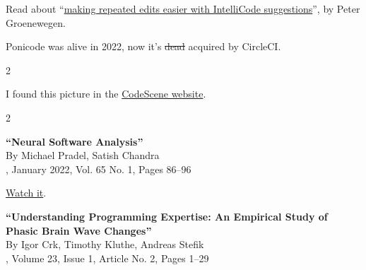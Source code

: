 \documentclass{article}
\begin{document}
\plush{}


Read about ``\href{https://devblogs.microsoft.com/visualstudio/making-repeated-edits-easier-with-intellicode-suggestions/}{making repeated edits easier with IntelliCode suggestions}'', by Peter Groenewegen.

\plush{}


Ponicode was alive in 2022, now it's \st{dead} acquired by CircleCI.

\plush{}


\begin{multicols}{2}
\par\columnbreak\par
I found this picture in the \href{https://codescene.com/engineering-blog/refactoring-recommendations}{CodeScene website}.
\end{multicols}

\plush{}


\begin{multicols}{2}
\par\columnbreak\par
{}
\end{multicols}



\textbf{``Neural Software Analysis''} \\
By Michael Pradel, Satish Chandra \\
, January 2022, Vol. 65 No. 1, Pages 86--96

\href{https://www.youtube.com/watch?v=Q0XJ5DoplRU}{Watch it}.

\plush{}


\textbf{``Understanding Programming Expertise: An Empirical Study of Phasic Brain Wave Changes''} \\
By Igor Crk, Timothy Kluthe, Andreas Stefik \\
, Volume 23, Issue 1, Article No. 2, Pages 1--29

\plush{}


\plush{}
\end{document}
